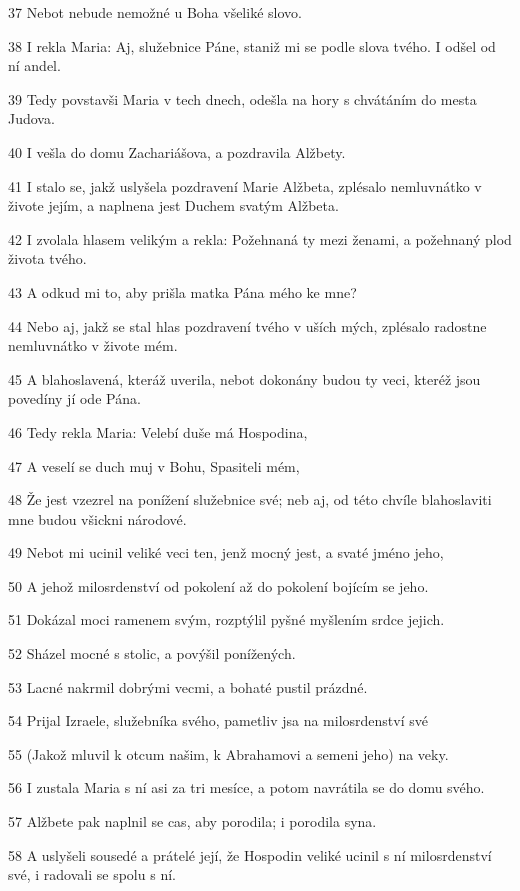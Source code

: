 \par 37 Nebot nebude nemožné u Boha všeliké slovo.
\par 38 I rekla Maria: Aj, služebnice Páne, staniž mi se podle slova tvého. I odšel od ní andel.
\par 39 Tedy povstavši Maria v tech dnech, odešla na hory s chvátáním do mesta Judova.
\par 40 I vešla do domu Zachariášova, a pozdravila Alžbety.
\par 41 I stalo se, jakž uslyšela pozdravení Marie Alžbeta, zplésalo nemluvnátko v živote jejím, a naplnena jest Duchem svatým Alžbeta.
\par 42 I zvolala hlasem velikým a rekla: Požehnaná ty mezi ženami, a požehnaný plod života tvého.
\par 43 A odkud mi to, aby prišla matka Pána mého ke mne?
\par 44 Nebo aj, jakž se stal hlas pozdravení tvého v uších mých, zplésalo radostne nemluvnátko v živote mém.
\par 45 A blahoslavená, kteráž uverila, nebot dokonány budou ty veci, kteréž jsou povedíny jí ode Pána.
\par 46 Tedy rekla Maria: Velebí duše má Hospodina,
\par 47 A veselí se duch muj v Bohu, Spasiteli mém,
\par 48 Že jest vzezrel na ponížení služebnice své; neb aj, od této chvíle blahoslaviti mne budou všickni národové.
\par 49 Nebot mi ucinil veliké veci ten, jenž mocný jest, a svaté jméno jeho,
\par 50 A jehož milosrdenství od pokolení až do pokolení bojícím se jeho.
\par 51 Dokázal moci ramenem svým, rozptýlil pyšné myšlením srdce jejich.
\par 52 Sházel mocné s stolic, a povýšil ponížených.
\par 53 Lacné nakrmil dobrými vecmi, a bohaté pustil prázdné.
\par 54 Prijal Izraele, služebníka svého, pametliv jsa na milosrdenství své
\par 55 (Jakož mluvil k otcum našim, k Abrahamovi a semeni jeho) na veky.
\par 56 I zustala Maria s ní asi za tri mesíce, a potom navrátila se do domu svého.
\par 57 Alžbete pak naplnil se cas, aby porodila; i porodila syna.
\par 58 A uslyšeli sousedé a prátelé její, že Hospodin veliké ucinil s ní milosrdenství své, i radovali se spolu s ní.
